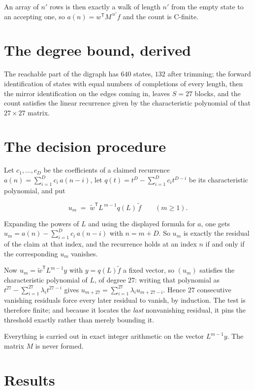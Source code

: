 \documentclass[11pt]{article}
\theoremstyle{definition}
\begin{document}
An array of $n'$ rows is then exactly a walk of length $n'$ from the empty state to an accepting one, so $a(n) = w^{\mathsf T}M^{\,n'}f$ and the count is C-finite.

\section{The degree bound, derived}

The reachable part of the digraph has $640$ states, $132$ after trimming; the forward identification of states with equal numbers of completions of every length, then the mirror identification on the edges coming in, leaves $S = 27$ blocks, and the count satisfies the linear recurrence given by the characteristic polynomial of that $27\times27$ matrix.

\section{The decision procedure}

Let $c_1,\dots,c_D$ be the coefficients of a claimed recurrence $a(n) = \sum_{i=1}^{D} c_i\,a(n-i)$, let $q(t) = t^{D} - \sum_{i=1}^{D} c_i t^{D-i}$ be its characteristic polynomial, and put

\[u_m \;=\; \tilde w^{\mathsf T} L^{\,m-1} q(L)\,\tilde f \qquad (m \ge 1).\]

Expanding the powers of $L$ and using the displayed formula for $a$, one gets $u_m = a(n) - \sum_{i=1}^{D} c_i\,a(n-i)$ with $n = m + D$. So $u_m$ is exactly the residual of the claim at that index, and the recurrence holds at an index $n$ if and only if the corresponding $u_m$ vanishes.

Now $u_m = \tilde w^{\mathsf T} L^{m-1} y$ with $y = q(L)\tilde f$ a fixed vector, so $(u_m)$ satisfies the characteristic polynomial of $L$, of degree $27$: writing that polynomial as $t^{27} - \sum_{i=1}^{27} \lambda_i t^{27-i}$ gives $u_{m+27} = \sum_{i=1}^{27} \lambda_i u_{m+27-i}$. Hence $27$ consecutive vanishing residuals force every later residual to vanish, by induction. The test is therefore finite; and because it locates the {\itshape last} nonvanishing residual, it pins the threshold exactly rather than merely bounding it.

Everything is carried out in exact integer arithmetic on the vector $L^{m-1}y$. The matrix $M$ is never formed.

\section{Results}
\end{document}

